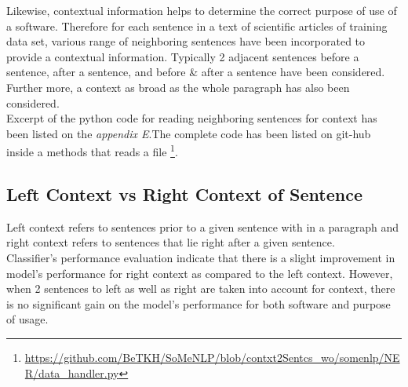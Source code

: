 Likewise, contextual information helps to determine the correct purpose of use of a software. Therefore for each sentence in a text of scientific articles of training data set, various range of neighboring sentences have been incorporated to provide a contextual information. Typically 2 adjacent sentences before a sentence, after a sentence, and before \& after a sentence have been considered. Further more, a context as broad as the whole paragraph has also been considered. \\

Excerpt of the python code for reading neighboring sentences for context has been listed on the \emph{appendix E}.The complete code has been listed on git-hub inside a methods that reads a file  \footnote{\url{https://github.com/BeTKH/SoMeNLP/blob/contxt2Sentcs_wo/somenlp/NER/data_handler.py}}. 

\subsection{Left Context vs Right Context of Sentence}
\label{sec:chapter06:leftvsright}

Left context refers to sentences prior to a given sentence with in  a paragraph and right context refers to sentences that lie right after a given sentence. \\

Classifier’s performance evaluation indicate that there is a slight improvement in model’s performance for right context as compared to the left context. However, when 2 sentences to left as well as right are taken into account for context, there is no significant gain on the model’s performance for both software and purpose of usage. \\

